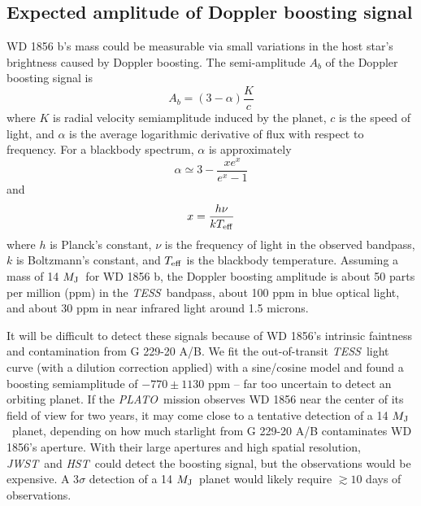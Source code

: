 \documentclass{nature3}
\newcommand*{\bedit}{\textcolor{new_black}}
\newcommand{\mjup}{\ensuremath{M_{\rm J}}}
\newcommand{\project}[1]{\textsl{#1}}
\newcommand{\JWST}{\project{JWST}}
\newcommand{\HST}{\project{HST}}
\newcommand{\PLATO}{\project{PLATO}}
\newcommand{\TESS}{\project{TESS}}
\begin{document}
\begin{methods}
\subsection{Expected amplitude of Doppler boosting signal}
\bedit{WD 1856 b's mass could be measurable via small variations in the host star's brightness caused by Doppler boosting\cite{loebgaudi, vanKerkwijk10}. The semi-amplitude $A_b$ of the Doppler boosting signal is
\begin{equation}
    A_{b} = (3-\alpha)\frac{K}{c}
\end{equation}
where $K$ is radial velocity semiamplitude induced by the planet, $c$ is the speed of light, and $\alpha$ is the average logarithmic derivative of flux with respect to frequency. For a blackbody spectrum, $\alpha$ is approximately
\begin{equation}
 \alpha \simeq 3 - \frac{xe^x}{e^x-1}
\end{equation}
and \begin{equation}
    x = \frac{h\nu}{kT_{\rm eff}}
\end{equation}
where $h$ is Planck's constant, $\nu$ is the frequency of light in the observed bandpass, $k$ is Boltzmann's constant, and $T_{\rm eff}$ is the blackbody temperature. Assuming a mass of 14 \mjup\ for WD 1856 b, the Doppler boosting amplitude is about 50 parts per million (ppm) in the \TESS\ bandpass, about 100 ppm in blue optical light, and about 30 ppm in near infrared light around 1.5 microns.}

\bedit{It will be difficult to detect these signals because of WD 1856's intrinsic faintness and contamination from G 229-20 A/B. We fit the out-of-transit \TESS\ light curve (with a dilution correction applied) with a sine/cosine model and found a boosting semiamplitude of  $-770 \pm 1130$ ppm -- far too uncertain to detect an orbiting planet. If the \PLATO\ mission\cite{plato2} observes WD 1856 near the center of its field of view for two years, it may come close to a tentative detection of a 14 \mjup\ planet, depending on how much starlight from G 229-20 A/B contaminates WD 1856's aperture. With their large apertures and high spatial resolution, \JWST\ and \HST\ could detect the boosting signal, but the observations would be expensive. A 3$\sigma$ detection of a 14 \mjup\ planet would likely require $\gtrsim 10$ days of observations.}

\vspace{2cm}





\end{methods}
\end{document}
